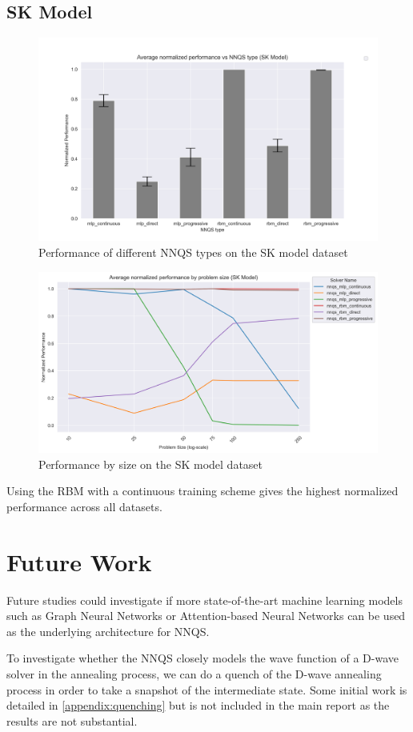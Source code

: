 \subsection{SK Model}
\begin{figure}[!h]
    \centering
    \includegraphics[width=1\linewidth]{images/skmodel_nnqs_avg.png}
    \caption{Performance of different NNQS types on the SK model dataset}
    \label{nnqs-skmodel-average}
\end{figure}

\begin{figure}[!h]
    \centering
    \includegraphics[width=1\linewidth]{images/skmodel_nnqs_size.png}
    \caption{Performance by size on the SK model dataset}
    \label{nnqs-skmodel-size}
\end{figure}

Using the RBM with a continuous training scheme gives the highest normalized performance across all datasets.

\section{Future Work}
Future studies could investigate if more state-of-the-art machine learning models such as Graph Neural Networks or Attention-based Neural Networks can be used as the underlying architecture for NNQS.

To investigate whether the NNQS closely models the wave function of a D-wave solver in the annealing process, we can do a quench of the D-wave annealing process in order to take a snapshot of the intermediate state. Some initial work is detailed in \autoref{appendix:quenching} but is not included in the main report as the results are not substantial.